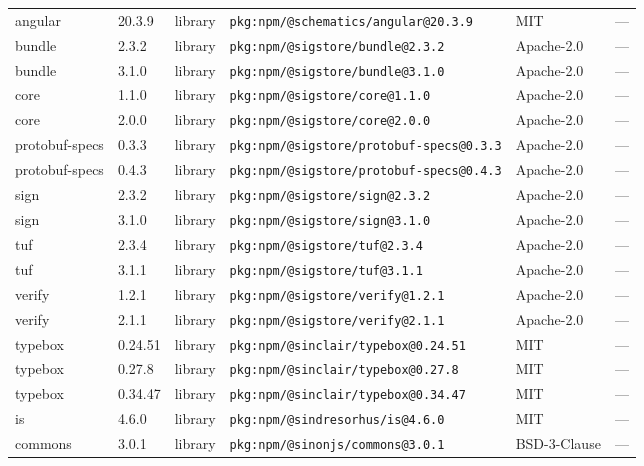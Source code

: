 \documentclass[11pt,a4paper]{article}
\begin{document}
\begin{longtable}{|p{4cm}|p{2cm}|p{1.6cm}|p{5cm}|p{1.5cm}|p{3.5cm}|}
\raggedright angular & 20.3.9 & library & \small\texttt{pkg:npm/@schematics/angular@20.3.9} & MIT & \small — \\
\raggedright bundle & 2.3.2 & library & \small\texttt{pkg:npm/@sigstore/bundle@2.3.2} & Apache-2.0 & \small — \\
\raggedright bundle & 3.1.0 & library & \small\texttt{pkg:npm/@sigstore/bundle@3.1.0} & Apache-2.0 & \small — \\
\raggedright core & 1.1.0 & library & \small\texttt{pkg:npm/@sigstore/core@1.1.0} & Apache-2.0 & \small — \\
\raggedright core & 2.0.0 & library & \small\texttt{pkg:npm/@sigstore/core@2.0.0} & Apache-2.0 & \small — \\
\raggedright protobuf-specs & 0.3.3 & library & \small\texttt{pkg:npm/@sigstore/protobuf-specs@0.3.3} & Apache-2.0 & \small — \\
\raggedright protobuf-specs & 0.4.3 & library & \small\texttt{pkg:npm/@sigstore/protobuf-specs@0.4.3} & Apache-2.0 & \small — \\
\raggedright sign & 2.3.2 & library & \small\texttt{pkg:npm/@sigstore/sign@2.3.2} & Apache-2.0 & \small — \\
\raggedright sign & 3.1.0 & library & \small\texttt{pkg:npm/@sigstore/sign@3.1.0} & Apache-2.0 & \small — \\
\raggedright tuf & 2.3.4 & library & \small\texttt{pkg:npm/@sigstore/tuf@2.3.4} & Apache-2.0 & \small — \\
\raggedright tuf & 3.1.1 & library & \small\texttt{pkg:npm/@sigstore/tuf@3.1.1} & Apache-2.0 & \small — \\
\raggedright verify & 1.2.1 & library & \small\texttt{pkg:npm/@sigstore/verify@1.2.1} & Apache-2.0 & \small — \\
\raggedright verify & 2.1.1 & library & \small\texttt{pkg:npm/@sigstore/verify@2.1.1} & Apache-2.0 & \small — \\
\raggedright typebox & 0.24.51 & library & \small\texttt{pkg:npm/@sinclair/typebox@0.24.51} & MIT & \small — \\
\raggedright typebox & 0.27.8 & library & \small\texttt{pkg:npm/@sinclair/typebox@0.27.8} & MIT & \small — \\
\raggedright typebox & 0.34.47 & library & \small\texttt{pkg:npm/@sinclair/typebox@0.34.47} & MIT & \small — \\
\raggedright is & 4.6.0 & library & \small\texttt{pkg:npm/@sindresorhus/is@4.6.0} & MIT & \small — \\
\raggedright commons & 3.0.1 & library & \small\texttt{pkg:npm/@sinonjs/commons@3.0.1} & BSD-3-Clause & \small — \\

\end{longtable}
\end{document}
